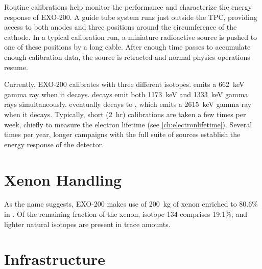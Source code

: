 \documentclass[herrin-thesis.tex]{subfiles}
\begin{document}
Routine calibrations help monitor the performance and characterize the energy response of EXO-200. A guide tube system runs just outside the TPC, providing access to both anodes and three positions around the circumference of the cathode. In a typical calibration run, a miniature radioactive source is pushed to one of these positions by a long cable. After enough time passes to accumulate enough calibration data, the source is retracted and normal physics operations resume.

Currently, EXO-200 calibrates with three different isotopes.  emits a \SI{662}{\keV} gamma ray when it decays.  decays emit both \SI{1173}{\keV} and \SI{1333}{\keV} gamma rays simultaneously.  eventually decays to , which emits a \SI{2615}{\keV} gamma ray when it decays. Typically, short (\SI{2}{hr})  calibrations are taken a few times per week, chiefly to measure the electron lifetime (see \cref{ch:electronlifetime}). Several times per year, longer campaigns with the full suite of sources establish the energy response of the detector.


\section{Xenon Handling}

As the name suggests, EXO-200 makes use of \SI{200}{\kg} of xenon enriched to 80.6\% in . Of the remaining fraction of the xenon, isotope 134 comprises 19.1\%, and lighter natural isotopes are present in trace amounts.

\section{Infrastructure}
\end{document}

